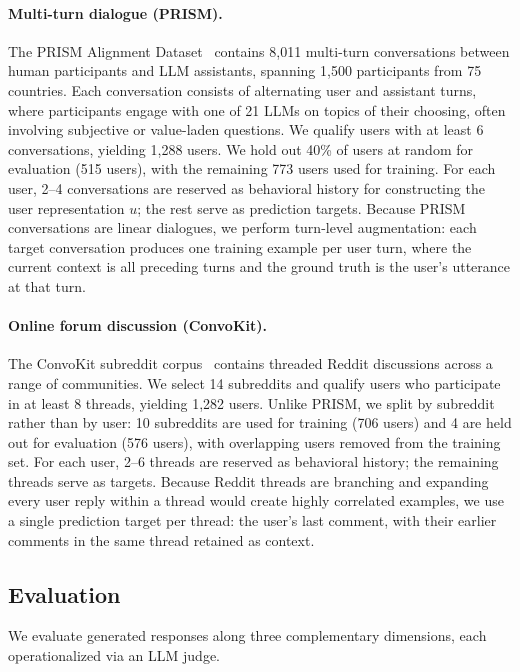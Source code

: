 \documentclass{article}
\begin{document}
\paragraph{Multi-turn dialogue (PRISM).}
The PRISM Alignment Dataset~\citep{kirk2024prism} contains 8,011 multi-turn conversations between human participants and LLM assistants, spanning 1,500 participants from 75 countries. Each conversation consists of alternating user and assistant turns, where participants engage with one of 21 LLMs on topics of their choosing, often involving subjective or value-laden questions. We qualify users with at least 6 conversations, yielding 1,288 users. We hold out 40\% of users at random for evaluation (515 users), with the remaining 773 users used for training. For each user, 2--4 conversations are reserved as behavioral history for constructing the user representation $u$; the rest serve as prediction targets. Because PRISM conversations are linear dialogues, we perform turn-level augmentation: each target conversation produces one training example per user turn, where the current context is all preceding turns and the ground truth is the user's utterance at that turn.
 
\paragraph{Online forum discussion (ConvoKit).}
The ConvoKit subreddit corpus~\citep{chang2020convokit} contains threaded Reddit discussions across a range of communities. We select 14 subreddits and qualify users who participate in at least 8 threads, yielding 1,282 users. Unlike PRISM, we split by subreddit rather than by user: 10 subreddits are used for training (706 users) and 4 are held out for evaluation (576 users), with overlapping users removed from the training set. For each user, 2--6 threads are reserved as behavioral history; the remaining threads serve as targets. Because Reddit threads are branching and expanding every user reply within a thread would create highly correlated examples, we use a single prediction target per thread: the user's last comment, with their earlier comments in the same thread retained as context.

 
\subsection{Evaluation}
 
We evaluate generated responses along three complementary dimensions, each operationalized via an LLM judge.
\end{document}
